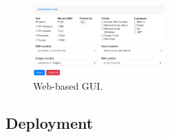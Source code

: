 \begin{figure}[!t]
\begin{center}
\includegraphics[width=0.45\textwidth]{bilder/ui.png}
\caption{\sys Web-based GUI.}
\label{fig:ui}
\end{center}
\end{figure}

\subsection{Deployment}

